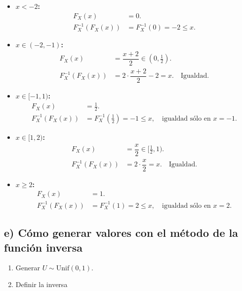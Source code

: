 \documentclass[10pt,a4paper]{article}
\begin{document}
    \begin{itemize}
\item
  \textbf{\(x<-2\):}\\
  \[
  \begin{align*}
  F_X(x) &= 0. \\
  F_X^{-1}(F_X(x)) &= F_X^{-1}(0) = -2 \leq x.
  \end{align*}
  \]
\item
  \textbf{\(x\in(-2,-1)\):}\\
  \[
  \begin{align*}
  F_X(x) &= \dfrac{x+2}{2} \in (0,\tfrac12). \\
  F_X^{-1}(F_X(x)) &= 2\cdot\dfrac{x+2}{2}-2 = x. \quad \text{Igualdad.}
  \end{align*}
  \]
\item
  \textbf{\(x\in[-1,1)\):}\\
  \[
  \begin{align*}
  F_X(x) &= \tfrac12. \\
  F_X^{-1}(F_X(x)) &= F_X^{-1}(\tfrac12) = -1 \leq x, \quad \text{igualdad sólo en } x=-1.
  \end{align*}
  \]
\item
  \textbf{\(x\in[1,2)\):}\\
  \[
  \begin{align*}
  F_X(x) &= \dfrac{x}{2} \in [\tfrac12,1). \\
  F_X^{-1}(F_X(x)) &= 2\cdot\dfrac{x}{2} = x. \quad \text{Igualdad.}
  \end{align*}
  \]
\item
  \textbf{\(x\geq 2\):}\\
  \[
  \begin{align*}
  F_X(x) &= 1. \\
  F_X^{-1}(F_X(x)) &= F_X^{-1}(1) = 2 \leq x, \quad \text{igualdad sólo en } x=2.
  \end{align*}
  \]
\end{itemize}

    \hypertarget{e-cuxf3mo-generar-valores-con-el-muxe9todo-de-la-funciuxf3n-inversa}{%
\subsection{e) Cómo generar valores con el método de la función
inversa}\label{e-cuxf3mo-generar-valores-con-el-muxe9todo-de-la-funciuxf3n-inversa}}

    \begin{enumerate}
\def\labelenumi{\arabic{enumi}.}
\item
  Generar \(U\sim\mathrm{Unif}(0,1)\).
\item
  Definir la inversa
\end{enumerate}
\end{document}
